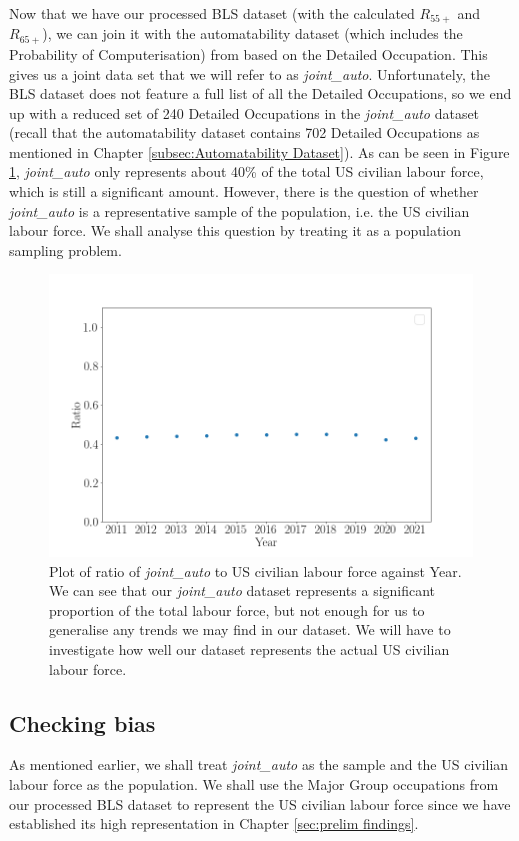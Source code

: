 \documentclass[11pt]{article}
\begin{document}
Now that we have our processed BLS dataset (with the calculated  $R_{55+}$ and $R_{65+}$), we can join it with the automatability dataset (which includes the Probability of Computerisation) from \cite{osborne2017future} based on the Detailed Occupation. This gives us a joint data set that we will refer to as \emph{joint\_auto}. Unfortunately, the BLS dataset does not feature a full list of all the Detailed Occupations, so we end up with a reduced set of 240 Detailed Occupations in the \emph{joint\_auto} dataset (recall that the automatability dataset contains 702 Detailed Occupations as mentioned in Chapter \ref{subsec:Automatability Dataset}). As can be seen in Figure \ref{fig:jointautoratio}, \emph{joint\_auto} only represents about 40\% of the total US civilian labour force, which is still a significant amount. However, there is the question of whether \emph{joint\_auto} is a representative sample of the population, i.e. the US civilian labour force. We shall analyse this question by treating it as a population sampling problem.

\begin{figure}[!htb]
	\centering
	\includegraphics[width=12cm]{Figures/joint_auto ratio scatter.png}
	\caption{Plot of ratio of \emph{joint\_auto} to US civilian labour force against Year. We can see that our \emph{joint\_auto} dataset represents a significant proportion of the total labour force, but not enough for us to generalise any trends we may find in our dataset. We will have to investigate how well our dataset represents the actual US civilian labour force.}
	\label{fig:jointautoratio}
\end{figure}


\subsection{Checking bias}
\label{subsec:Checking biasness}
As mentioned earlier, we shall treat \emph{joint\_auto} as the sample and the US civilian labour force as the population. We shall use the Major Group occupations from our processed BLS dataset to represent the US civilian labour force since we have established its high representation in Chapter \ref{sec:prelim findings}.
\end{document}
